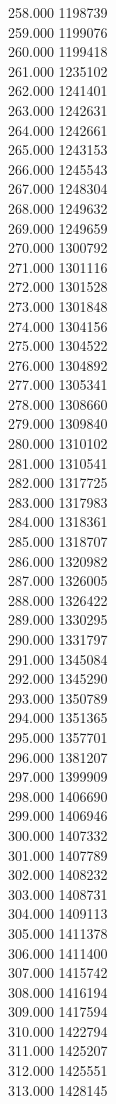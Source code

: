 { 258.000	1198739 \\
 259.000	1199076 \\
 260.000	1199418 \\
 261.000	1235102 \\
 262.000	1241401 \\
 263.000	1242631 \\
 264.000	1242661 \\
 265.000	1243153 \\
 266.000	1245543 \\
 267.000	1248304 \\
 268.000	1249632 \\
 269.000	1249659 \\
 270.000	1300792 \\
 271.000	1301116 \\
 272.000	1301528 \\
 273.000	1301848 \\
 274.000	1304156 \\
 275.000	1304522 \\
 276.000	1304892 \\
 277.000	1305341 \\
 278.000	1308660 \\
 279.000	1309840 \\
 280.000	1310102 \\
 281.000	1310541 \\
 282.000	1317725 \\
 283.000	1317983 \\
 284.000	1318361 \\
 285.000	1318707 \\
 286.000	1320982 \\
 287.000	1326005 \\
 288.000	1326422 \\
 289.000	1330295 \\
 290.000	1331797 \\
 291.000	1345084 \\
 292.000	1345290 \\
 293.000	1350789 \\
 294.000	1351365 \\
 295.000	1357701 \\
 296.000	1381207 \\
 297.000	1399909 \\
 298.000	1406690 \\
 299.000	1406946 \\
 300.000	1407332 \\
 301.000	1407789 \\
 302.000	1408232 \\
 303.000	1408731 \\
 304.000	1409113 \\
 305.000	1411378 \\
 306.000	1411400 \\
 307.000	1415742 \\
 308.000	1416194 \\
 309.000	1417594 \\
 310.000	1422794 \\
 311.000	1425207 \\
 312.000	1425551 \\
 313.000	1428145 \\
}
